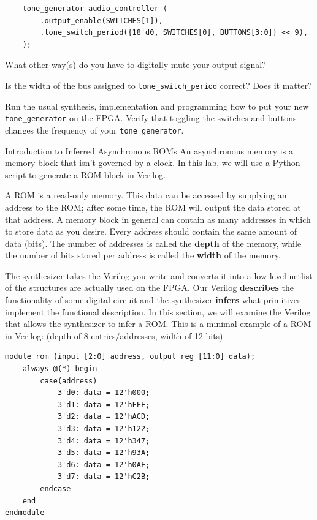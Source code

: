 \documentclass[11pt]{article}
\makeatletter
\renewcommand{\section}
{\@startsection {section}{1}{0pt}
 {-2ex}
 {1ex}
 {\bfseries\Large}}
\makeatother
\begin{document}
\begin{verbatim}
    tone_generator audio_controller (
        .output_enable(SWITCHES[1]),
        .tone_switch_period({18'd0, SWITCHES[0], BUTTONS[3:0]} << 9),
    );
\end{verbatim}

What other way(s) do you have to digitally mute your output signal?

Is the width of the bus assigned to \verb|tone_switch_period| correct? Does it matter?

Run the usual synthesis, implementation and programming flow to put your new \verb|tone_generator| on the FPGA. Verify that toggling the switches and buttons changes the frequency of your \verb|tone_generator|.



\section{Introduction to Inferred Asynchronous ROMs}
An asynchronous memory is a memory block that isn't governed by a clock. In this lab, we will use a Python script to generate a ROM block in Verilog.

A ROM is a read-only memory. This data can be accessed by supplying an address to the ROM; after some time, the ROM will output the data stored at that address. A memory block in general can contain as many addresses in which to store data as you desire. Every address should contain the same amount of data (bits). The number of addresses is called the \textbf{depth} of the memory, while the number of bits stored per address is called the \textbf{width} of the memory.

The synthesizer takes the Verilog you write and converts it into a low-level netlist of the structures are actually used on the FPGA. Our Verilog \textbf{describes} the functionality of some digital circuit and the synthesizer \textbf{infers} what primitives implement the functional description. In this section, we will examine the Verilog that allows the synthesizer to infer a ROM. This is a minimal example of a ROM in Verilog: (depth of 8 entries/addresses, width of 12 bits)

\begin{verbatim}
module rom (input [2:0] address, output reg [11:0] data);
	always @(*) begin
		case(address)
			3'd0: data = 12'h000;
			3'd1: data = 12'hFFF;
			3'd2: data = 12'hACD;
			3'd3: data = 12'h122;
			3'd4: data = 12'h347;
			3'd5: data = 12'h93A;
			3'd6: data = 12'h0AF;
			3'd7: data = 12'hC2B;
		endcase
	end
endmodule
\end{verbatim}
\end{document}
